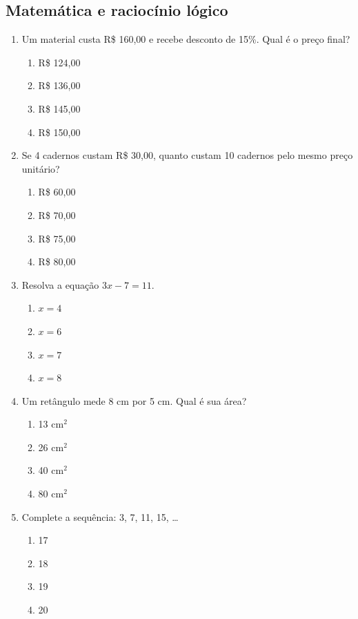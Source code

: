 \documentclass[12pt,a4paper]{article}
\begin{document}
\subsection*{Matemática e raciocínio lógico}
\begin{enumerate}[resume]
  \item Um material custa R\$ 160,00 e recebe desconto de 15\%. Qual é o preço final?
  \begin{enumerate}[label=\alph*)]
    \item R\$ 124,00
    \item R\$ 136,00
    \item R\$ 145,00
    \item R\$ 150,00
  \end{enumerate}

  \item Se 4 cadernos custam R\$ 30,00, quanto custam 10 cadernos pelo mesmo preço unitário?
  \begin{enumerate}[label=\alph*)]
    \item R\$ 60,00
    \item R\$ 70,00
    \item R\$ 75,00
    \item R\$ 80,00
  \end{enumerate}

  \item Resolva a equação $3x-7=11$.
  \begin{enumerate}[label=\alph*)]
    \item $x=4$
    \item $x=6$
    \item $x=7$
    \item $x=8$
  \end{enumerate}

  \item Um retângulo mede 8 cm por 5 cm. Qual é sua área?
  \begin{enumerate}[label=\alph*)]
    \item 13 cm$^2$
    \item 26 cm$^2$
    \item 40 cm$^2$
    \item 80 cm$^2$
  \end{enumerate}

  \item Complete a sequência: 3, 7, 11, 15, \ldots
  \begin{enumerate}[label=\alph*)]
    \item 17
    \item 18
    \item 19
    \item 20
  \end{enumerate}
\end{enumerate}
\end{document}
